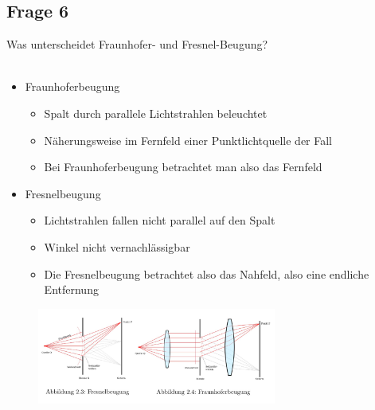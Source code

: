 \documentclass[a4paper,10pt]{scrartcl}
\begin{document}
		\subsection{Frage 6}
		Was unterscheidet Fraunhofer- und Fresnel-Beugung?\\
		\\
		\begin{itemize}
			\item Fraunhoferbeugung
			\begin{itemize}
				\item Spalt durch parallele Lichtstrahlen beleuchtet
				\item Näherungsweise im Fernfeld einer Punktlichtquelle der Fall
				\item Bei Fraunhoferbeugung betrachtet man also das Fernfeld
			\end{itemize}
			\item Fresnelbeugung
			\begin{itemize}
				\item Lichtstrahlen fallen nicht parallel auf den Spalt
				\item Winkel nicht vernachlässigbar
				\item Die Fresnelbeugung betrachtet also das Nahfeld, also eine endliche Entfernung
			\end{itemize}
		\end{itemize}

\FloatBarrier
			\begin{figure}[h]
\centering
\includegraphics[width=0.7\textwidth]{./Bilder/lb3}

\end{figure}
\FloatBarrier
			
\end{document}

